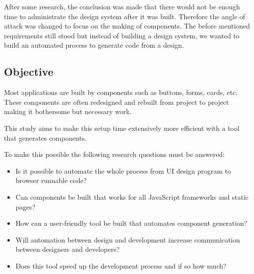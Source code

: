 After some research, the conclusion was made that there would not be enough time to administrate the design system after it was built. Therefore the angle of attack was changed to focus on the making of components. The before mentioned requirements still stood but instead of building a design system, we wanted to build an automated process to generate code from a design. 








\subsection{Objective}
\label{sub:Objective}
Most applications are built by components such as buttons, forms, cards\cite{babichSimpleDesignTips2020}, etc. These components are often redesigned and rebuilt from project to project making it bothersome but necessary work.


This study aims to make this setup time extensively more efficient with a tool that generates components. 

To make this possible the following research questions must be answered:
\begin{itemize}
  \item Is it possible to automate the whole process from UI design program to browser runnable code? 
 \item Can components be built that works for all JavaScript frameworks and static pages?
  \item How can a user-friendly tool be built that automates component generation?  
  \item Will automation between design and development increase communication between designers and developers?
  \item Does this tool speed up the development process and if so how much?
\end{itemize}


